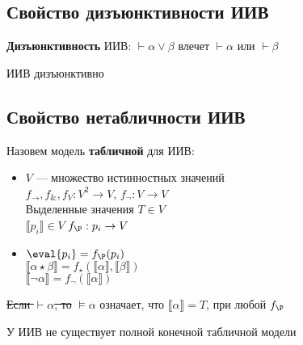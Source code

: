 \documentclass[english]{article}
\begin{document}
\subsection{Свойство дизъюнктивности ИИВ}
\label{sec:orgeea008a}
\begin{definition}
	\textbf{Дизъюнктивность} ИИВ: \(\vdash \alpha \vee \beta\) влечет \(\vdash \alpha\) или \(\vdash \beta\)
	\label{org07d0876}
\end{definition}
\begin{theorem}
	ИИВ дизъюнктивно
	\label{orgd9ed491}
\end{theorem}
\subsection{Свойство нетабличности ИИВ}
\label{sec:org2fd4f34}
\begin{definition}
	Назовем модель \textbf{табличной} для ИИВ:
	\begin{itemize}
		\item \(V\) --- множество истинностных значений \\
		      \(f_\to,f_\&, f_V: V^2 \to V\), \(f_\neg: V \to V\) \\
		      Выделенные значения \(T \in V\) \\
		      \(\llbracket p_i \rrbracket \in V\) \(f_\P : p_i \to V\)
		\item \(\eval{p_i} = f_\P(p_i)\) \\
		      \(\llbracket\alpha \star \beta\rrbracket = f_\star(\llbracket\alpha\rrbracket, \llbracket\beta\rrbracket)\) \\
		      \(\llbracket\neg \alpha\rrbracket = f_\neg(\llbracket\alpha\rrbracket)\)
	\end{itemize}
	\sout{Если \(\vdash \alpha\), то} \(\vDash \alpha\) означает, что \(\llbracket\alpha\rrbracket = T\), при любой \(f_\P\)
	\label{org2678362}
\end{definition}
\begin{theorem}
	У ИИВ не существует полной конечной табличной модели
	\label{org8999247}
\end{theorem}
\end{document}
